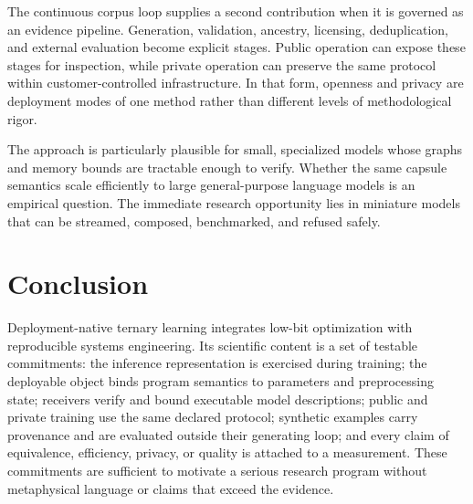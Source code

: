 \documentclass[11pt]{article}
\begin{document}
The continuous corpus loop supplies a second contribution when it is governed as an evidence pipeline. Generation, validation, ancestry, licensing, deduplication, and external evaluation become explicit stages. Public operation can expose these stages for inspection, while private operation can preserve the same protocol within customer-controlled infrastructure. In that form, openness and privacy are deployment modes of one method rather than different levels of methodological rigor.

The approach is particularly plausible for small, specialized models whose graphs and memory bounds are tractable enough to verify. Whether the same capsule semantics scale efficiently to large general-purpose language models is an empirical question. The immediate research opportunity lies in miniature models that can be streamed, composed, benchmarked, and refused safely.

\section*{Conclusion}
Deployment-native ternary learning integrates low-bit optimization with reproducible systems engineering. Its scientific content is a set of testable commitments: the inference representation is exercised during training; the deployable object binds program semantics to parameters and preprocessing state; receivers verify and bound executable model descriptions; public and private training use the same declared protocol; synthetic examples carry provenance and are evaluated outside their generating loop; and every claim of equivalence, efficiency, privacy, or quality is attached to a measurement. These commitments are sufficient to motivate a serious research program without metaphysical language or claims that exceed the evidence.
\end{document}
